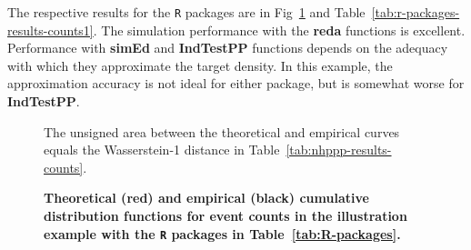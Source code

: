 \documentclass[10pt,letterpaper]{article}
\newcommand{\pkg}[1]{{\bf #1}}
\newcommand{\proglang}[1]{\texttt{#1}}
\begin{document}
The respective results for the \proglang{R} packages are in Fig~\ref{fig:r-pkgs-pkg-counts} and Table~\ref{tab:r-packages-results-counts1}. The simulation performance with the \pkg{reda} functions is excellent. Performance with \pkg{simEd} and \pkg{IndTestPP} functions depends on the adequacy with which they approximate the target density. In this example, the approximation accuracy is not ideal for either package, but is somewhat worse for \pkg{IndTestPP}.

\begin{Schunk}
\begin{figure}[ht!]
\caption{{\bf Theoretical (red) and empirical (black) cumulative distribution functions for event counts in the illustration example with the \proglang{R} packages in Table~\ref{tab:R-packages}.}}\label{fig:r-pkgs-pkg-counts}
%\texttt{[image: figure/r-pkgs-pkg-counts-1]} 
\begin{flushleft}
The unsigned area between the theoretical and empirical curves equals the Wasserstein-1 distance in Table~\ref{tab:nhppp-results-counts}.
\end{flushleft}
\end{figure}
\end{Schunk}
\end{document}
